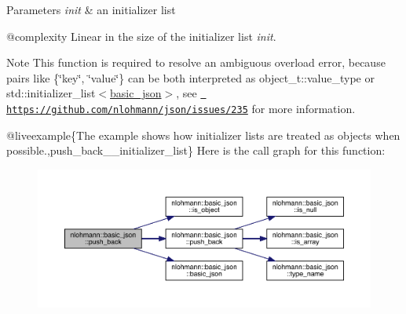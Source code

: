 \begin{DoxyParams}{Parameters}
{\em init} & an initializer list\\
\hline
\end{DoxyParams}
@complexity Linear in the size of the initializer list {\itshape init}.

\begin{DoxyNote}{Note}
This function is required to resolve an ambiguous overload error, because pairs like {\ttfamily \{\char`\"{}key\char`\"{}, \char`\"{}value\char`\"{}\}} can be both interpreted as {\ttfamily object\+\_\+t\+::value\+\_\+type} or {\ttfamily std\+::initializer\+\_\+list$<$\mbox{\hyperlink{classnlohmann_1_1basic__json}{basic\+\_\+json}}$>$}, see \href{https://github.com/nlohmann/json/issues/235}{\texttt{ https\+://github.\+com/nlohmann/json/issues/235}} for more information.
\end{DoxyNote}
@liveexample\{The example shows how initializer lists are treated as objects when possible.,push\+\_\+back\+\_\+\+\_\+initializer\+\_\+list\} Here is the call graph for this function\+:
\nopagebreak
\begin{figure}[H]
\begin{center}
\leavevmode
\includegraphics[width=350pt]{classnlohmann_1_1basic__json_ab2716cbe2e997ab8309926b87f044434_cgraph}
\end{center}
\end{figure}
\mbox{\label{classnlohmann_1_1basic__json_a1ef93e2006dbe52667294f5ef38b0b10}} 
